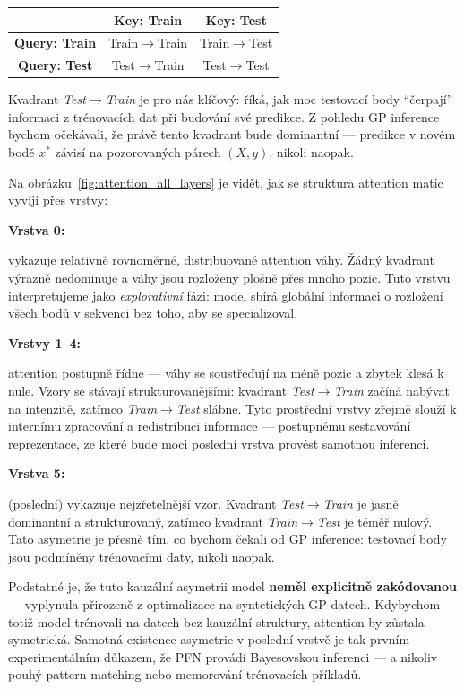 \begin{center}
\begin{tabular}{c|c|c}
 & \textbf{Key: Train} & \textbf{Key: Test} \\
\hline
\textbf{Query: Train} & Train$\to$Train & Train$\to$Test \\
\hline
\textbf{Query: Test}  & Test$\to$Train  & Test$\to$Test  \\
\end{tabular}
\end{center}

Kvadrant \textit{Test$\to$Train} je pro nás klíčový: říká, jak moc testovací body ``čerpají'' informaci z trénovacích dat při budování své predikce.
Z pohledu GP inference bychom očekávali, že právě tento kvadrant bude dominantní — predikce v novém bodě $x^*$ závisí na pozorovaných párech $(X, y)$, nikoli naopak.
\par

Na obrázku~\ref{fig:attention_all_layers} je vidět, jak se struktura attention matic vyvíjí přes vrstvy:

\textbf{Vrstva 0:}

vykazuje relativně rovnoměrné, distribuované attention váhy.
Žádný kvadrant výrazně nedominuje a váhy jsou rozloženy plošně přes mnoho pozic.
Tuto vrstvu interpretujeme jako \textit{explorativní} fázi: model sbírá globální informaci o rozložení všech bodů v sekvenci bez toho, aby se specializoval.

\textbf{Vrstvy 1–4:}

attention postupně řídne — váhy se soustřeďují na méně pozic a zbytek klesá k nule.
Vzory se stávají strukturovanějšími: kvadrant \textit{Test$\to$Train} začíná nabývat na intenzitě, zatímco \textit{Train$\to$Test} slábne.
Tyto prostřední vrstvy zřejmě slouží k internímu zpracování a redistribuci informace — postupnému sestavování reprezentace, ze které bude moci poslední vrstva provést samotnou inferenci.

\textbf{Vrstva 5:}
 
(poslední) vykazuje nejzřetelnější vzor.
Kvadrant \textit{Test$\to$Train} je jasně dominantní a strukturovaný, zatímco kvadrant \textit{Train$\to$Test} je téměř nulový.
Tato asymetrie je přesně tím, co bychom čekali od GP inference: testovací body jsou podmíněny trénovacími daty, nikoli naopak.
\par

Podstatné je, že tuto kauzální asymetrii model \textbf{neměl explicitně zakódovanou} — vyplynula přirozeně z optimalizace na syntetických GP datech.
Kdybychom totiž model trénovali na datech bez kauzální struktury, attention by zůstala symetrická.
Samotná existence asymetrie v poslední vrstvě je tak prvním experimentálním důkazem, že PFN provádí Bayesovskou inferenci — a nikoliv pouhý pattern matching nebo memorování trénovacích příkladů.

